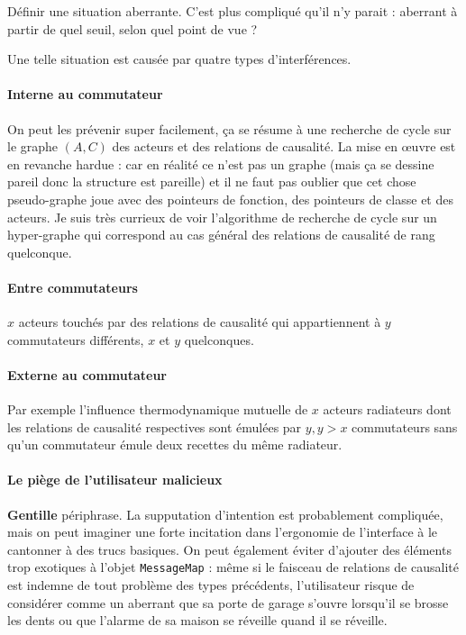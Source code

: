 \documentclass[11pt]{article}
\begin{document}
Définir une situation aberrante. C'est plus compliqué qu'il n'y parait : aberrant à partir de quel seuil, selon quel point de vue ?

Une telle situation est causée par quatre types d'interférences.

\paragraph{Interne au commutateur} On peut les prévenir super facilement, ça se résume à une recherche de cycle sur le graphe $(A, C)$ des acteurs et des relations de causalité. La mise en œuvre est en revanche hardue : car en réalité ce n'est pas un graphe (mais ça se dessine pareil donc la structure est pareille) et il ne faut pas oublier que cet chose pseudo-graphe joue avec des pointeurs de fonction, des pointeurs de classe et des acteurs. Je suis très currieux de voir l'algorithme de recherche de cycle sur un hyper-graphe qui correspond au cas général des relations de causalité de rang quelconque.

\paragraph{Entre commutateurs} $x$ acteurs touchés par des relations de causalité qui appartiennent à $y$ commutateurs différents, $x$ et $y$ quelconques.

\paragraph{Externe au commutateur} Par exemple l'influence thermodynamique mutuelle de $x$ acteurs radiateurs dont les relations de causalité respectives sont émulées par $y, y > x$ commutateurs sans qu'un commutateur émule deux recettes du même radiateur.

\paragraph{Le piège de l'utilisateur malicieux} \textbf{Gentille} périphrase. La supputation d'intention est probablement compliquée, mais on peut imaginer une forte incitation dans l'ergonomie de l'interface à le cantonner à des trucs basiques. On peut également éviter d'ajouter des éléments trop exotiques à l'objet \texttt{MessageMap} : même si le faisceau de relations de causalité est indemne de tout problème des types précédents, l'utilisateur risque de considérer comme un aberrant que sa porte de garage s'ouvre lorsqu'il se brosse les dents ou que l'alarme de sa maison se réveille quand il se réveille.
\end{document}
